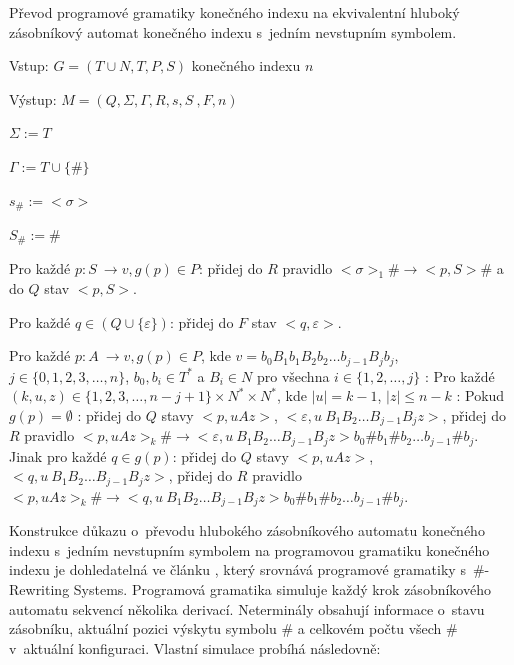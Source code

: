 \begin{Alg} \label{alg_PG}
Převod programové gramatiky konečného indexu na ekvivalentní hluboký zásobníkový automat konečného indexu s~jedním nevstupním symbolem.

\begin{list}{}{\setlength\parsep{0cm} \setlength\itemsep{0cm} \setlength\leftmargin{1em}}
  \item Vstup: $G = (T \cup N ,T,P,S)$ konečného indexu $n$
  \item Výstup: $M = (Q,\Sigma,\Gamma, R, s, S~, F, n)$ \medskip
  
  \item ${\Sigma} := T$
  \item ${\Gamma} := T \cup \{\#\}$
  \item $s_\# := <\sigma>$
  \item $S_\# := \# $ \medskip

  \item Pro každé $p: S~\rightarrow v, g(p) \in P$: 
  \subitem přidej do $R$ pravidlo $<\sigma>_1 \# \rightarrow <p, S> \#$ a do $Q$ stav $<p, S>$. \medskip

  \item Pro každé $q \in (Q \cup \{\varepsilon\})$: 
  \subitem přidej do $F$ stav $<q, \varepsilon>$. \medskip

  \item Pro každé $p: A~\rightarrow v, g(p) \in P$,  kde $v=b_0 B_1 b_1 B_2 b_2 \dots b_{j-1} B_{j} b_j$, $j \in \{0,1,2,3,\dots,n\}$, $b_0,b_i \in T^*$ a $B_i \in N$ pro všechna $i \in \{1,2,\dots,j\}$ : \medskip
  \subitem Pro každé $(k,u,z) \in \{1,2,3,\dots,n-j+1\} \times N^* \times N^*$, kde $|u| = k-1$, $|z|  \le n-k$ : \medskip
  \subsubitem Pokud $g(p) = \emptyset$ :
  \subsubitem přidej do $Q$ stavy $<p,uAz>$, $<\varepsilon, u~B_1 B_2 \dots B_{j-1} B_{j} z>$,
  \subsubitem přidej do $R$ pravidlo $<p,uAz>_k \# \rightarrow <\varepsilon, u~B_1 B_2 \dots B_{j-1} B_{j} z> b_0 \# b_1 \# b_2 \dots b_{j-1} \# b_j$.\medskip
  \subsubitem Jinak pro každé $q \in g(p)$:
  \subsubitem přidej do $Q$ stavy $<p,uAz>$, $<q, u~B_1 B_2 \dots B_{j-1} B_{j} z>$,
  \subsubitem přidej do $R$ pravidlo $<p,uAz>_k \# \rightarrow <q, u~B_1 B_2 \dots B_{j-1} B_{j} z> b_0 \# b_1 \# b_2 \dots b_{j-1} \# b_j$.

\end{list}
\end{Alg}



Konstrukce důkazu o~převodu hlubokého zásobníkového automatu konečného indexu s~jedním nevstupním symbolem na programovou gramatiku konečného indexu je dohledatelná ve článku \cite{Krivka:RewritingSystems}, který srovnává programové gramatiky s~\#-Rewriting Systems. Programová gramatika simuluje každý krok zásobníkového automatu sekvencí několika derivací. Neterminály obsahují informace o~stavu zásobníku, aktuální pozici výskytu symbolu \# a celkovém počtu všech \# v~aktuální konfiguraci. Vlastní simulace probíhá následovně:

